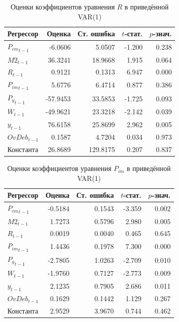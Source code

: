 \begin{table}[H]
\centering
\small

\begin{tabular}{l|r|r|r|r}
\hline
Регрессор & Оценка & Ст. ошибка & $t$-стат. & $p$-знач.\\
\hline
${P_{cm}}_{t-1}$ & -6.0606 & 5.0507 & -1.200 & 0.238\\
\hline
${M2}_{t-1}$ & 36.3241 & 18.9668 & 1.915 & 0.064\\
\hline
${R}_{t-1}$ & 0.9121 & 0.1313 & 6.947 & 0.000\\
\hline
${P_{im}}_{t-1}$ & 5.6776 & 6.4714 & 0.877 & 0.386\\
\hline
${P_y}_{t-1}$ & -57.9453 & 33.5853 & -1.725 & 0.093\\
\hline
${W}_{t-1}$ & -49.9621 & 23.3218 & -2.142 & 0.039\\
\hline
${y}_{t-1}$ & 76.6158 & 25.8699 & 2.962 & 0.005\\
\hline
${OvDeb}_{t-1}$ & 0.1587 & 4.7204 & 0.034 & 0.973\\
\hline
Константа & 26.8689 & 129.8175 & 0.207 & 0.837\\
\hline
\end{tabular}
\caption{Оценки коэффициентов уравнения $R$ в приведённой VAR(1)}
\label{tab:var_coef_key_rate}
\end{table}

\begin{table}[H]
\centering
\small

\begin{tabular}{l|r|r|r|r}
\hline
Регрессор & Оценка & Ст. ошибка & $t$-стат. & $p$-знач.\\
\hline
${P_{cm}}_{t-1}$ & -0.5184 & 0.1543 & -3.359 & 0.002\\
\hline
${M2}_{t-1}$ & 1.7273 & 0.5796 & 2.980 & 0.005\\
\hline
${R}_{t-1}$ & 0.0019 & 0.0040 & 0.465 & 0.645\\
\hline
${P_{im}}_{t-1}$ & 1.4436 & 0.1978 & 7.300 & 0.000\\
\hline
${P_y}_{t-1}$ & -2.7805 & 1.0263 & -2.709 & 0.010\\
\hline
${W}_{t-1}$ & -1.9760 & 0.7127 & -2.773 & 0.009\\
\hline
${y}_{t-1}$ & 2.1235 & 0.7905 & 2.686 & 0.011\\
\hline
${OvDeb}_{t-1}$ & 0.1629 & 0.1442 & 1.129 & 0.267\\
\hline
Константа & 2.9529 & 3.9670 & 0.744 & 0.462\\
\hline
\end{tabular}
\caption{Оценки коэффициентов уравнения $P_{im}$ в приведённой VAR(1)}
\label{tab:var_coef_p_im}
\end{table}


